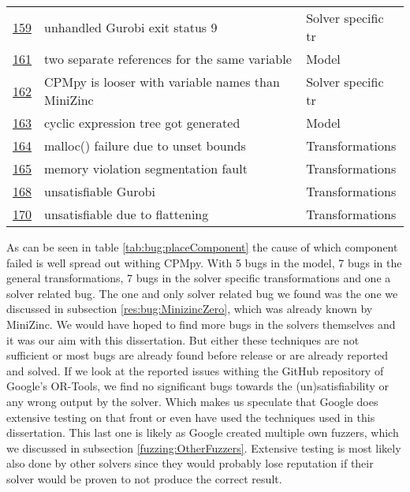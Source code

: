 \begin{table}[]
\begin{tabular}{lll}
		\href{https://github.com/CPMpy/cpmpy/issues/159}{159} & unhandled Gurobi exit status 9                    & Solver specific tr \\
		\href{https://github.com/CPMpy/cpmpy/issues/161}{161} & two separate references for the same variable     & Model              \\
		\href{https://github.com/CPMpy/cpmpy/issues/162}{162} & CPMpy is looser with variable names than MiniZinc & Solver specific tr \\
		\href{https://github.com/CPMpy/cpmpy/issues/163}{163} & cyclic expression tree got generated               & Model              \\
		\href{https://github.com/CPMpy/cpmpy/issues/164}{164} & malloc() failure due to unset bounds              & Transformations     \\
		\href{https://github.com/CPMpy/cpmpy/issues/165}{165} & memory violation segmentation fault               & Transformations     \\
		\href{https://github.com/CPMpy/cpmpy/issues/168}{168} & unsatisfiable Gurobi                              & Transformations     \\
		\href{https://github.com/CPMpy/cpmpy/issues/170}{170} & unsatisfiable due to flattening                   & Transformations     \\ \bottomrule        
	\end{tabular}
\end{table}

As can be seen in table \ref{tab:bug:placeComponent} the cause of which component failed is well spread out withing CPMpy. 
With 5 bugs in the model, 7 bugs in the general transformations, 7 bugs in the solver specific transformations and one a solver related bug. The one and only solver related bug we found was the one we discussed in subsection \ref{res:bug:MinizincZero}, which was already known by MiniZinc. We would have hoped to find more bugs in the solvers themselves and it was our aim with this dissertation. But either these techniques are not sufficient or most bugs are already found before release or are already reported and solved.
If we look at the reported issues withing the GitHub repository of Google's OR-Tools, we find no significant bugs towards the (un)satisfiability or any wrong output by the solver. Which makes us speculate that Google does extensive testing on that front or even have used the techniques used in this dissertation. This last one is likely as Google created multiple own fuzzers, which we discussed in subsection  \ref{fuzzing:OtherFuzzers}. Extensive testing is most likely also done by other solvers since they would probably lose reputation if their solver would be proven to not produce the correct result.

